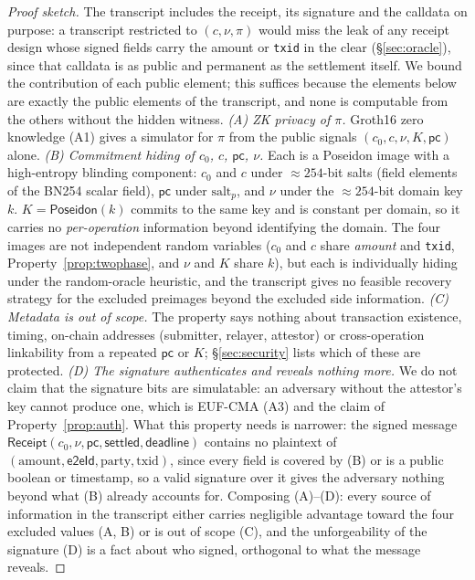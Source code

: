 \documentclass[11pt]{article}
\newcommand{\Poseidon}{\ensuremath{\mathsf{Poseidon}}}
\newcommand{\eeid}{\ensuremath{\mathsf{e2eId}}}
\newcommand{\code}[1]{\texttt{#1}}
\begin{document}
\begin{proof}[Proof sketch]
The transcript includes the receipt, its signature and the calldata on purpose:
a transcript restricted to $(c,\nu,\pi)$ would miss the leak of any receipt
design whose signed fields carry the amount or \code{txid} in the clear
(\S\ref{sec:oracle}), since that calldata is as public and permanent as the
settlement itself. We bound the contribution of each public element; this
suffices because the elements below are exactly the public elements of the
transcript, and none is computable from the others without the hidden witness.
\emph{(A) ZK privacy of $\pi$.} Groth16 zero knowledge (A1) gives a simulator for
$\pi$ from the public signals $(c_0,c,\nu,K,\mathsf{pc})$ alone.
\emph{(B) Commitment hiding of $c_0$, $c$, $\mathsf{pc}$, $\nu$.} Each is a
Poseidon image with a high-entropy blinding component: $c_0$ and $c$ under
$\approx 254$-bit salts (field elements of the BN254 scalar field), $\mathsf{pc}$
under $\text{salt}_p$, and $\nu$ under the $\approx 254$-bit domain key $k$.
$K=\Poseidon(k)$ commits to the same key and is constant per domain, so it
carries no \emph{per-operation} information beyond identifying the domain. The
four images are not independent random variables ($c_0$ and $c$ share
\emph{amount} and \code{txid}, Property~\ref{prop:twophase}, and $\nu$ and $K$
share $k$), but each is individually hiding under the random-oracle heuristic,
and the transcript gives no feasible recovery strategy for the excluded
preimages beyond the excluded side information.
\emph{(C) Metadata is out of scope.} The property says nothing about transaction
existence, timing, on-chain addresses (submitter, relayer, attestor) or
cross-operation linkability from a repeated $\mathsf{pc}$ or $K$;
\S\ref{sec:security} lists which of these are protected.
\emph{(D) The signature authenticates and reveals nothing more.} We do not claim
that the signature bits are simulatable: an adversary without the attestor's key
cannot produce one, which is EUF-CMA (A3) and the claim of
Property~\ref{prop:auth}. What this property needs is narrower: the signed
message
$\mathsf{Receipt}(c_0,\allowbreak\nu,\allowbreak\mathsf{pc},\allowbreak\mathsf{settled},\allowbreak\mathsf{deadline})$
contains no plaintext of $(\text{amount},\eeid,\text{party},\text{txid})$, since
every field is covered by (B) or is a public boolean or timestamp, so a valid
signature over it gives the adversary nothing beyond what (B) already accounts
for. Composing (A)--(D): every source of information in the transcript either
carries negligible advantage toward the four excluded values (A, B) or is out of
scope (C), and the unforgeability of the signature (D) is a fact about who
signed, orthogonal to what the message reveals.
\end{proof}
\end{document}
